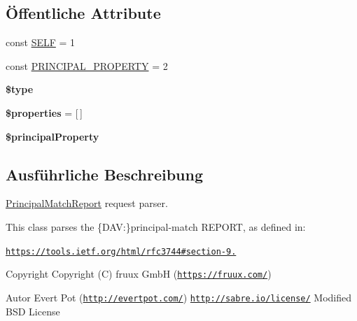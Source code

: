 \subsection*{Öffentliche Attribute}
\begin{DoxyCompactItemize}
\item 
const \mbox{\hyperlink{class_sabre_1_1_d_a_v_a_c_l_1_1_xml_1_1_request_1_1_principal_match_report_a488afd96cfc4165f6bf7d35c37078aa3}{S\+E\+LF}} = 1
\item 
const \mbox{\hyperlink{class_sabre_1_1_d_a_v_a_c_l_1_1_xml_1_1_request_1_1_principal_match_report_ab5d7b5c04b0b65be4ce4587ec0439cee}{P\+R\+I\+N\+C\+I\+P\+A\+L\+\_\+\+P\+R\+O\+P\+E\+R\+TY}} = 2
\item 
\mbox{\label{class_sabre_1_1_d_a_v_a_c_l_1_1_xml_1_1_request_1_1_principal_match_report_a0bec6af8b69ef0654f9cf357790bd532}} 
{\bfseries \$type}
\item 
\mbox{\label{class_sabre_1_1_d_a_v_a_c_l_1_1_xml_1_1_request_1_1_principal_match_report_a9e818454ee1c543d4c3e716082534c2f}} 
{\bfseries \$properties} = \mbox{[}$\,$\mbox{]}
\item 
\mbox{\label{class_sabre_1_1_d_a_v_a_c_l_1_1_xml_1_1_request_1_1_principal_match_report_a43b61a5251b1f4ce0289002bb6e62ec1}} 
{\bfseries \$principal\+Property}
\end{DoxyCompactItemize}


\subsection{Ausführliche Beschreibung}
\mbox{\hyperlink{class_sabre_1_1_d_a_v_a_c_l_1_1_xml_1_1_request_1_1_principal_match_report}{Principal\+Match\+Report}} request parser.

This class parses the \{D\+AV\+:\}principal-\/match R\+E\+P\+O\+RT, as defined in\+:

\href{https://tools.ietf.org/html/rfc3744#section-9.3}{\tt https\+://tools.\+ietf.\+org/html/rfc3744\#section-\/9.}

\begin{DoxyCopyright}{Copyright}
Copyright (C) fruux GmbH (\href{https://fruux.com/}{\tt https\+://fruux.\+com/}) 
\end{DoxyCopyright}
\begin{DoxyAuthor}{Autor}
Evert Pot (\href{http://evertpot.com/}{\tt http\+://evertpot.\+com/})  \href{http://sabre.io/license/}{\tt http\+://sabre.\+io/license/} Modified B\+SD License 
\end{DoxyAuthor}


